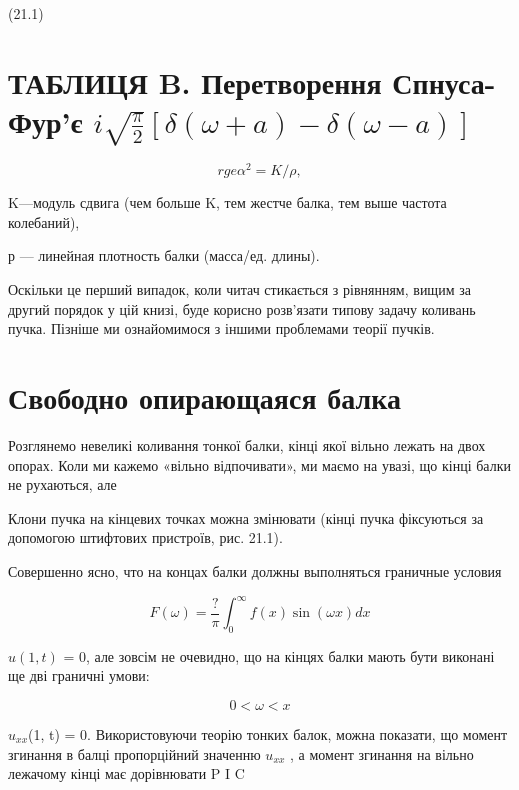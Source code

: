 \documentclass[
  ukrainian,
]{article}
\begin{document}
(21.1)

\section{\texorpdfstring{ТАБЛИЦЯ B. Перетворення Спнуса-Фур'є
\(i \sqrt{\frac{\pi}{2}} [\delta(\omega+a) - \delta(\omega-a)]\)}{ТАБЛИЦЯ B. Перетворення Спнуса-Фур'є i \textbackslash sqrt\{\textbackslash frac\{\textbackslash pi\}\{2\}\} {[}\textbackslash delta(\textbackslash omega+a) - \textbackslash delta(\textbackslash omega-a){]}}}\label{ux442ux430ux431ux43bux438ux446ux44f-b.-ux43fux435ux440ux435ux442ux432ux43eux440ux435ux43dux43dux44f-ux441ux43fux43dux443ux441ux430-ux444ux443ux440ux454-i-sqrtfracpi2-deltaomegaa---deltaomega-a}

\[
rge  \alpha^2 = K/\rho  ,
\]

K---модуль сдвига (чем больше K, тем жестче балка, тем выше частота
колебаний),

р --- линейная плотность балки (масса/ед. длины).

Оскільки це перший випадок, коли читач стикається з рівнянням, вищим за
другий порядок у цій книзі, буде корисно розв'язати типову задачу
коливань пучка. Пізніше ми ознайомимося з іншими проблемами теорії
пучків.

\section{Свободно опирающаяся
балка}\label{ux441ux432ux43eux431ux43eux434ux43dux43e-ux43eux43fux438ux440ux430ux44eux449ux430ux44fux441ux44f-ux431ux430ux43bux43aux430}

Розглянемо невеликі коливання тонкої балки, кінці якої вільно лежать на
двох опорах. Коли ми кажемо «вільно відпочивати», ми маємо на увазі, що
кінці балки не рухаються, але

Клони пучка на кінцевих точках можна змінювати (кінці пучка фіксуються
за допомогою штифтових пристроїв, рис. 21.1).

Совершенно ясно, что на концах балки должны выполняться граничные
условия

\[
F(\omega) = \frac{?}{\pi} \int_{0}^{\infty} f(x) \sin(\omega x) dx
\]

\(u(1, t)\) = 0, але зовсім не очевидно, що на кінцях балки мають бути
виконані ще дві граничні умови:

\[
0 < \omega < x
\]

\(u_{xx}\)(1, t) = 0. Використовуючи теорію тонких балок, можна
показати, що момент згинання в балці пропорційний значенню \(u_{xx}\) ,
а момент згинання на вільно лежачому кінці має дорівнювати P I C
\end{document}
